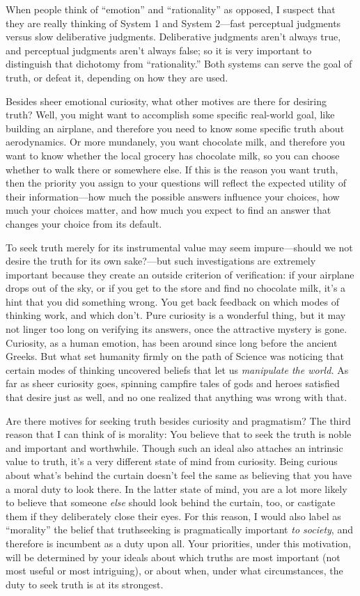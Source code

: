 {
 When people think of
``emotion'' and
``rationality'' as opposed, I
suspect that they are really thinking of System 1 and System 2---fast
perceptual judgments versus slow deliberative judgments. Deliberative
judgments aren't always true, and perceptual judgments
aren't always false; so it is very important to
distinguish that dichotomy from
``rationality.'' Both systems can
serve the goal of truth, or defeat it, depending on how they are used.}

{
 Besides sheer emotional curiosity, what other motives are there
for desiring truth? Well, you might want to accomplish some specific
real-world goal, like building an airplane, and therefore you need to
know some specific truth about aerodynamics. Or more mundanely, you
want chocolate milk, and therefore you want to know whether the local
grocery has chocolate milk, so you can choose whether to walk there or
somewhere else. If this is the reason you want truth, then the priority
you assign to your questions will reflect the expected utility of their
information---how much the possible answers influence your choices, how
much your choices matter, and how much you expect to find an answer
that changes your choice from its default.}

{
 To seek truth merely for its instrumental value may seem
impure---should we not desire the truth for its own sake?---but such
investigations are extremely important because they create an outside
criterion of verification: if your airplane drops out of the sky, or if
you get to the store and find no chocolate milk, it's a
hint that you did something wrong. You get back feedback on which modes
of thinking work, and which don't. Pure curiosity is a
wonderful thing, but it may not linger too long on verifying its
answers, once the attractive mystery is gone. Curiosity, as a human
emotion, has been around since long before the ancient Greeks. But what
set humanity firmly on the path of Science was noticing that certain
modes of thinking uncovered beliefs that let us \textit{manipulate the
world.} As far as sheer curiosity goes, spinning campfire tales of gods
and heroes satisfied that desire just as well, and no one realized that
anything was wrong with that.}

{
 Are there motives for seeking truth besides curiosity and
pragmatism? The third reason that I can think of is morality: You
believe that to seek the truth is noble and important and worthwhile.
Though such an ideal also attaches an intrinsic value to truth,
it's a very different state of mind from curiosity.
Being curious about what's behind the curtain
doesn't feel the same as believing that you have a
moral duty to look there. In the latter state of mind, you are a lot
more likely to believe that someone \textit{else} should look behind
the curtain, too, or castigate them if they deliberately close their
eyes. For this reason, I would also label as
``morality'' the belief that
truthseeking is pragmatically important \textit{to society}, and
therefore is incumbent as a duty upon all. Your priorities, under this
motivation, will be determined by your ideals about which truths are
most important (not most useful or most intriguing), or about when,
under what circumstances, the duty to seek truth is at its strongest.}

